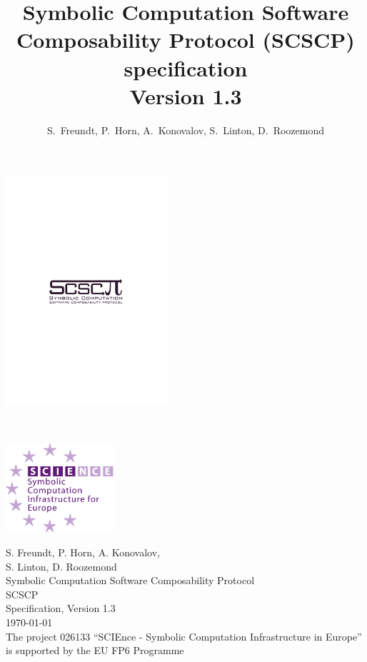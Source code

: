 \documentclass{amsart}
\title[SCSCP Specification]{Symbolic Computation Software Composability Protocol (SCSCP) specification \\ Version 1.3}
\author{S.~Freundt, P.~Horn, A.~Konovalov, S.~Linton, D.~Roozemond}
\begin{document}
\thispagestyle{empty}
\hspace{-15mm}
\begin{minipage}{60mm}
	\rule{0pt}{0pt}\par\vfill
	\includegraphics[width=60mm]{SCSCP_logo}
	\par\vfill\rule{0pt}{0pt}
\end{minipage} 
\ \hspace{50mm} 
\begin{minipage}{40mm}
	\rule{0pt}{0pt}\par\vfill
	\includegraphics[width=40mm]{SCIEnce_logo}
	\par\vfill\rule{0pt}{0pt}
\end{minipage} 

\vspace{15mm}

\begin{center}
\sc
\Large
S. Freundt,
P. Horn,
A. Konovalov, \\
S. Linton,
D. Roozemond \\
\vspace{10mm}
\Huge 
Symbolic Computation Software Composability Protocol \\
\vspace{10mm}
SCSCP\\
\vspace{10mm}
Specification, 
Version 1.3 \\
\vspace{10mm}
\Large
\today \\
\vspace{40mm}
{\Small The project 026133 ``SCIEnce - Symbolic Computation Infrastructure in Europe'' \\
is supported by the EU FP6 Programme}
\end{center}
\end{document}
